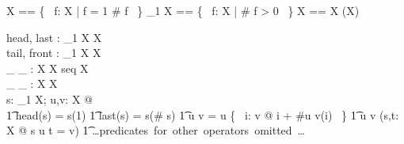 \begin{zed}
	\seq X == \{~ f: \nat \ffun X | \dom f = 1 \upto \# f ~\}
\also
	\seq_1 X == \{~ f: \seq X | \# f > 0 ~\}
\also
	\iseq X == \seq X \cap (\nat \pinj X)
\end{zed}

\begin{gendef}[X]
	head, last : \seq_1 X \fun X \\
	tail, front : \seq_1 X \fun \seq X \\
	\_ \cat \_ : \seq X \cross \seq X \fun seq X \\
	\_ \inseq \_ : \seq X \rel \seq X \\
\where
	\forall s: \seq_1 X; u,v: \seq X @ \\
\also 
\t1	head(s) = s(1) \land
\also
\t1	last(s) = s(\# s) \land
\also
\t1	u \cat v = u \cup \{~ i: \dom v @ i + \#u \mapsto v(i) ~\}
\also
\t1	u \inseq v \iff (\exists s,t: \seq X @ s \cat u \cat t = v) 
\also
\t1	\mbox{\dots predicates for other operators omitted \dots}
\also
\end{gendef}
